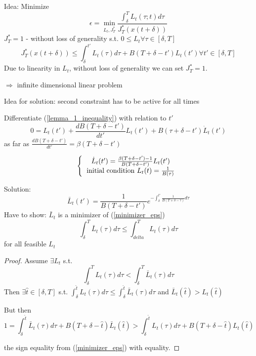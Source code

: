 Idea: Minimize 
\begin{equation}\label{minimizer_eps}
\epsilon = \min_{L_t,J^*_T}\frac{\int_{\delta}^{T}L_t(\tau;t)d\tau}{J_T^*(x(t+\delta))}
\end{equation}
$J^*_T = 1$ - without loss of generality
s.t. $0 \leq L_t \forall \tau \in [\delta,T]$
\begin{equation*}
J^*_T(x(t+\delta)) \leq \int_{\delta}^{t'}L_t(\tau)d\tau + B(T+\delta-t')L_t(t') \forall t' \in [\delta, T]
\end{equation*}
Due to linearity in $L_t$, without loss of generality we can set $J_T^* = 1$.

$\Rightarrow$ infinite dimensional linear problem

Idea for solution:
second constraint has to be active for all times 

Differentiate (\ref{lemma_1_inequality}) with relation to $t'$ 
\begin{equation*}
0 = L_t(t') + \frac{dB(T+\delta-t')}{dt'}L_t(t') + B(\tau + \delta - t') \dot L_t(t')
\end{equation*} 
as far as $\frac{dB(T+\delta-t')}{dt'} = \beta(T+\delta - t')$

\begin{equation*}
\left \{
  \begin{tabular}{c}
  $\dot L_t(t') = \frac{\beta(T+\delta - t') -1}{B(T+\delta - t')}L_t(t')$ \\
 initial condition $L_t(t)=\frac{1}{B(\tau)}$
  \end{tabular}
\right .
\end{equation*}

Solution:
\begin{equation*}
\bar L_t(t') = \frac{1}{B(T+\delta-t')}e^{-\int_{\delta}^{t'}\frac{1}{B(T+\delta-\tau)}d\tau}
\end{equation*}
Have to show: $\bar L_t$ is a minimizer of (\ref{minimizer_eps})
\begin{equation*}
\int_{\delta}^{T} \bar L_t(\tau)d\tau \leq \int_{delta}^{T} L_t(\tau)d\tau 
\end{equation*}
for all feasible $L_t$

\begin{proof}

Assume $\exists L_t$ s.t. 
\begin{equation*}
\int_{\delta}^{T}L_t(\tau)d\tau < \int_{\delta}^{T}\bar L_t(\tau)d\tau
\end{equation*}
Then $\exists \hat t \in [\delta, T]$ s.t. $\int_{\delta}^{\hat t}L_t(\tau)d\tau \leq \int_{\delta}^{\hat t}\bar L_t(\tau)d\tau$ and $\bar L_t(\hat t) > L_t(\hat t)$

But then 
\begin{equation}
1 = \int_{\delta}^{\hat t} \bar L_t(\tau)d\tau + B(T+\delta-\hat t)\bar L_t(\hat t) > \int_{\delta}^{\hat t}L_t(\tau)d\tau + B(T+\delta-\hat t) L_t(\hat t)
\end{equation}

the sign equality from (\ref{minimizer_eps}) with equality.
\end{proof}

